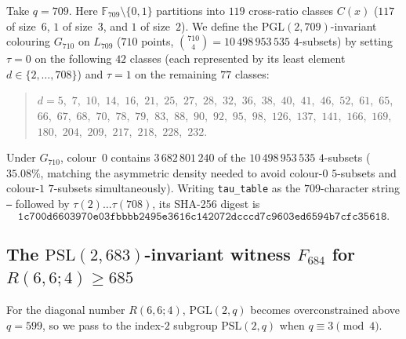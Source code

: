 \documentclass[11pt]{article}
\theoremstyle{remark}
\newcommand{\F}{\mathbb{F}}
\begin{document}
Take $q=709$. Here $\F_{709}\setminus\{0,1\}$ partitions into $119$ cross-ratio
classes $C(x)$ ($117$ of size~$6$, $1$ of size~$3$, and $1$ of size~$2$). We
define the $\mathrm{PGL}(2,709)$-invariant colouring $G_{710}$ on $L_{709}$
($710$ points, $\binom{710}{4}=10\,498\,953\,535$ $4$-subsets) by setting
$\tau=0$ on the following $42$ classes (each represented by its least element
$d\in\{2,\dots,708\}$) and $\tau=1$ on the remaining $77$ classes:
\begin{quote}
\small\raggedright
$d = 5$,\allowbreak\ $7$,\allowbreak\ $10$,\allowbreak\ $14$,\allowbreak\ $16$,\allowbreak\ $21$,\allowbreak\ $25$,\allowbreak\ $27$,\allowbreak\ $28$,\allowbreak\ $32$,\allowbreak\ $36$,\allowbreak\ $38$,\allowbreak\ $40$,\allowbreak\ $41$,\allowbreak\ $46$,\allowbreak\ $52$,\allowbreak\ $61$,\allowbreak\ $65$,\allowbreak\ $66$,\allowbreak\ $67$,\allowbreak\ $68$,\allowbreak\ $70$,\allowbreak\ $78$,\allowbreak\ $79$,\allowbreak\ $83$,\allowbreak\ $88$,\allowbreak\ $90$,\allowbreak\ $92$,\allowbreak\ $95$,\allowbreak\ $98$,\allowbreak\ $126$,\allowbreak\ $137$,\allowbreak\ $141$,\allowbreak\ $166$,\allowbreak\ $169$,\allowbreak\ $180$,\allowbreak\ $204$,\allowbreak\ $209$,\allowbreak\ $217$,\allowbreak\ $218$,\allowbreak\ $228$,\allowbreak\ $232$.
\par
\end{quote}
Under $G_{710}$, colour~$0$ contains $3\,682\,801\,240$ of the
$10\,498\,953\,535$ $4$-subsets ($35.08\%$, matching the asymmetric density
needed to avoid colour-$0$ $5$-subsets and colour-$1$ $7$-subsets
simultaneously). Writing \texttt{tau\_table} as the $709$-character string
\texttt{--} followed by $\tau(2)\dots\tau(708)$, its SHA-256 digest is
\[
  \texttt{1c700d6603970e03fbbbb2495e3616c142072dcccd7c9603ed6594b7cfc35618}.
\]

\subsection{The $\mathrm{PSL}(2,683)$-invariant witness $F_{684}$ for $R(6,6;4)\ge 685$}

For the diagonal number $R(6,6;4)$, $\mathrm{PGL}(2,q)$ becomes overconstrained
above $q=599$, so we pass to the index-$2$ subgroup $\mathrm{PSL}(2,q)$ when
$q\equiv 3\pmod 4$.
\end{document}
